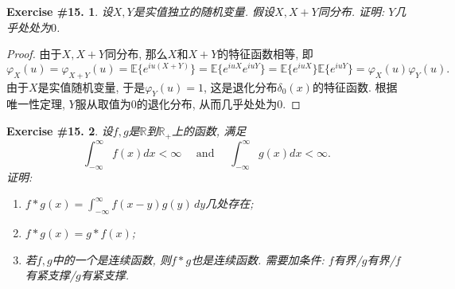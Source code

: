 \documentclass[UTF8, a4paper]{article}
\newtheorem{exercise}{Exercise \#15.}
\begin{document}
\begin{framed}
\begin{exercise}
设\(X,Y\)是实值独立的随机变量. 
假设\(X, X+Y\)同分布. 证明: \(Y\)几乎处处为\(0\).
\end{exercise}
\end{framed}

\begin{proof}
由于\(X, X+Y\)同分布, 那么\(X\)和\(X+Y\)的特征函数相等, 即
$$
\varphi_X(u) = \varphi_{X+Y}(u) = \mathbb{E}\{e^{i u (X+Y)}\} = \mathbb{E}\{e^{i u X}e^{i u Y}\} = \mathbb{E}\{e^{i u X}\}\mathbb{E}\{e^{i u Y}\} = \varphi_X(u)\varphi_Y(u).
$$
由于\(X\)是实值随机变量, 于是\(\varphi_Y(u) = 1\), 
这是退化分布\(\delta_{0}(x)\)的特征函数. 根据唯一性定理, \(Y\)服从取值为\(0\)的退化分布, 从而几乎处处为\(0\).
\end{proof}



\begin{framed}
\begin{exercise}
设\(f, g\)是\(\mathbb{R}\)到\(\mathbb{R}_+\)上的函数, 满足
$$
\int_{-\infty}^{\infty} f(x) d x<\infty \quad \text { and } \quad \int_{-\infty}^{\infty} g(x) d x<\infty .
$$
证明:
\begin{enumerate}
    \item \(f * g(x) = \int_{-\infty}^{\infty} f(x - y)g(y) \,dy\){\color{red}几处}存在;
    \item \(f*g(x) = g*f(x)\);
    \item 若\(f, g\)中的一个是连续函数, 则\(f*g\)也是连续函数. {\color{red}需要加条件: \(f\)有界/\(g\)有界/\(f\)有紧支撑/\(g\)有紧支撑}.
\end{enumerate}
\end{exercise}
\end{framed}
\end{document}

